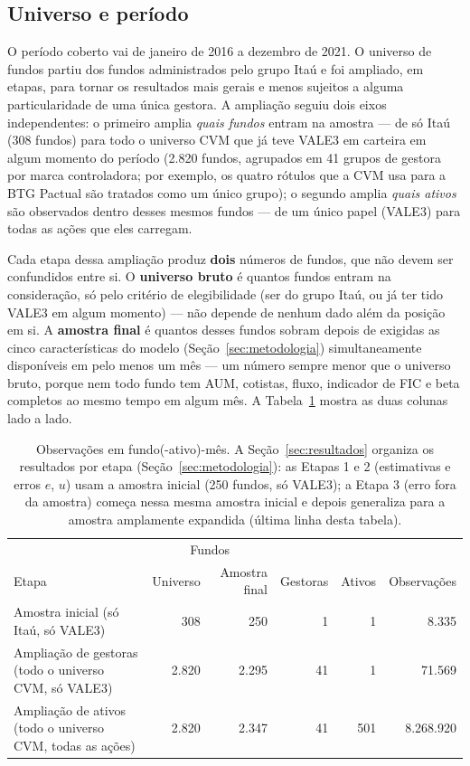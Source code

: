 \documentclass[11pt,a4paper]{article}
\begin{document}
\FloatBarrier
\subsection{Universo e período}

O período coberto vai de janeiro de 2016 a dezembro de 2021. O universo de fundos partiu dos
fundos administrados pelo grupo Itaú e foi ampliado, em etapas, para tornar os resultados mais
gerais e menos sujeitos a alguma particularidade de uma única gestora. A ampliação seguiu dois
eixos independentes: o primeiro amplia \emph{quais fundos} entram na amostra --- de só Itaú
(308 fundos) para todo o universo CVM que já teve VALE3 em carteira em algum momento do período
(2.820 fundos, agrupados em 41 grupos de gestora por marca controladora; por exemplo, os quatro
rótulos que a CVM usa para a BTG Pactual são tratados como um único grupo); o segundo amplia
\emph{quais ativos} são observados dentro desses mesmos fundos --- de um único papel (VALE3)
para todas as ações que eles carregam.

Cada etapa dessa ampliação produz \textbf{dois} números de fundos, que não devem ser confundidos
entre si. O \textbf{universo bruto} é quantos fundos entram na consideração, só pelo critério de
elegibilidade (ser do grupo Itaú, ou já ter tido VALE3 em algum momento) --- não depende de
nenhum dado além da posição em si. A \textbf{amostra final} é quantos desses fundos sobram depois
de exigidas as cinco características do modelo (Seção~\ref{sec:metodologia}) simultaneamente
disponíveis em pelo menos um mês --- um número sempre menor que o universo bruto, porque nem todo
fundo tem AUM, cotistas, fluxo, indicador de FIC e beta completos ao mesmo tempo em algum mês. A
Tabela~\ref{tab:universo} mostra as duas colunas lado a lado.

\begin{table}[h]\centering\small
\caption{Evolução do universo de dados ao longo do trabalho.}
\label{tab:universo}
\begin{tabular}{@{}p{6.0cm}rrrrr@{}}
\toprule
 & \multicolumn{2}{c}{Fundos} & & & \\
Etapa & Universo & Amostra final & Gestoras & Ativos & Observações \\
\midrule
Amostra inicial (só Itaú, só VALE3) & 308 & 250 & 1 & 1 & 8.335 \\
Ampliação de gestoras (todo o universo CVM, só VALE3) & 2.820 & 2.295 & 41 & 1 & 71.569 \\
Ampliação de ativos (todo o universo CVM, todas as ações) & 2.820 & 2.347 & 41 & 501 & 8.268.920 \\
\bottomrule
\end{tabular}
\caption*{\footnotesize Observações em fundo(-ativo)-mês. A Seção~\ref{sec:resultados} organiza
os resultados por etapa (Seção~\ref{sec:metodologia}): as Etapas 1 e 2 (estimativas e erros $e$,
$u$) usam a amostra inicial (250 fundos, só VALE3); a Etapa 3 (erro fora da amostra) começa nessa
mesma amostra inicial e depois generaliza para a amostra amplamente expandida (última linha desta
tabela).}
\end{table}
\end{document}
